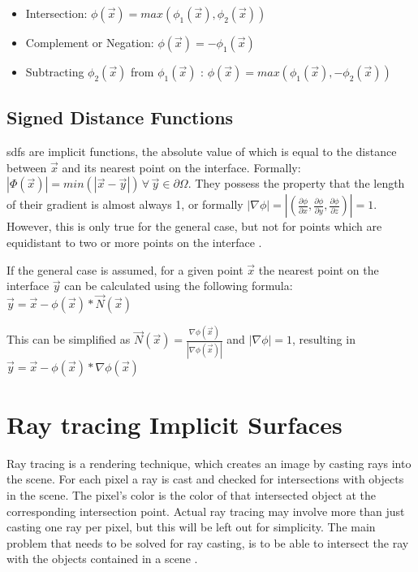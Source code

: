 \begin{itemize}
	\item Intersection:  $\phi(\vec{x}) = max(\phi_1(\vec{x}), \phi_2(\vec{x}))$
	\item Complement or Negation: $\phi(\vec{x}) = -\phi_1(\vec{x})$ 
	\item Subtracting $\phi_2(\vec{x})$ from $\phi_1(\vec{x})$ :  $\phi(\vec{x}) = max(\phi_1(\vec{x}), -\phi_2(\vec{x}))$
\end{itemize}

\subsection{Signed Distance Functions}
\Glspl{sdf} are implicit functions, the absolute value of which is equal to the distance between $\vec{x}$ and its nearest point on the interface. Formally:  $|\Phi(\vec{x})| = min(|\vec{x} - \vec{y}|) \, \forall \, \vec{y} \in \partial\Omega$. They possess the property that the length of their gradient is almost always 1, or formally  $|\nabla\phi| = |(\frac{\partial\phi}{\partial x},\frac{\partial\phi}{\partial y},\frac{\partial\phi}{\partial z})| = 1$. However, this is only true for the general case, but not for points which are equidistant to two or more points on the interface \cite{osher:2006:level}.

If the general case is assumed, for a given point $\vec{x}$ the nearest point on the interface $\vec{y}$ can be calculated using the following formula: $\vec{y} = \vec{x} - \phi(\vec{x}) * \vec{N}(\vec{x}) $

This can be simplified as  $\vec{N}(\vec{x}) = \frac{\nabla\phi(\vec{x})}{|\nabla\phi(\vec{x})|}$ and $|\nabla\phi| = 1$, resulting in 
$\vec{y} = \vec{x} - \phi(\vec{x}) * \nabla\phi(\vec{x}) $ \cite{osher:2006:level}

\section{Ray tracing Implicit Surfaces}
Ray tracing is a rendering technique, which creates an image by casting rays into the scene. For each pixel a ray is cast and checked for intersections with objects in the scene. The pixel's color is the color of that intersected object at the corresponding intersection point. Actual ray tracing may involve more than just casting one ray per pixel, but this will be left out for simplicity. The main problem that needs to be solved for ray casting, is to be able to intersect the ray with the objects contained in a scene \cite{bungartz:2013:einfuhrung}.

